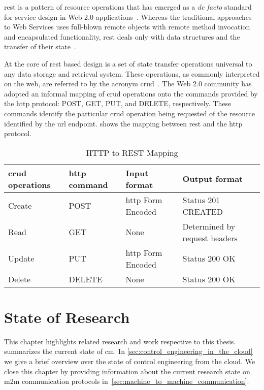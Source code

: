 \documentclass[
a4paper,
twoside,
headsepline,
cleardoublepage=empty,
parskip=half,
draft=false
]{scrbook}
\begin{document}
			\gls{rest} is a pattern of resource operations that has emerged as a \textit{de facto} standard for service design in Web 2.0 applications~\cite{battle2008bridging}. Whereas the traditional approaches to Web Services uses full-blown remote objects with remote method invocation and encapsulated functionality, \gls{rest} deals only with data structures and the transfer of their state~\cite{fielding2000architectural}.
			
			At the core of \gls{rest} based design is a set of state transfer operations universal to any data storage and retrieval system.
			These operations, as commonly interpreted on the web, are referred to by the acronym \gls{crud}~\cite{battle2008bridging}.
			The Web 2.0 community has adopted an informal mapping of \gls{crud} operations onto the commands provided by the \gls{http} protocol: POST, GET, PUT, and DELETE, respectively. 
			These commands identify the particular \gls{crud} operation being requested of the resource identified by the \gls{url} endpoint.
			 shows the mapping between \gls{rest} and the \gls{http} protocol.
			
			\begin{table}[hbtp]
				\centering
				\caption{HTTP to REST Mapping}
				\label{tab:http_rest_mapping}
				\begin{tabular}{@{}llll@{}}
					\toprule
					\gls{crud} operations & \gls{http} command & Input format & Output format
					\\ \midrule
					Create & POST & \gls{http} Form Encoded & Status 201 CREATED
					\\ \midrule
					Read & GET & None & Determined by request headers 
					\\ \midrule
					Update & PUT & \gls{http} Form Encoded & Status 200 OK
					\\ \midrule
					Delete & DELETE & None & Status 200 OK
					\\ \bottomrule
				\end{tabular}
			\end{table}

	\chapter{State of Research} \label{ch:state_of_the_Science}

		This chapter highlights related research and work respective to this thesis.  summarizes the current state of \gls{cm}. In \cref{sec:control_engineering_in_the_cloud} we give a brief overview over the state of control engineering from the cloud. We close this chapter by providing information about the current research state on \gls{m2m} communication protocols in~\cref{sec:machine_to_machine_communication}.
\end{document}
